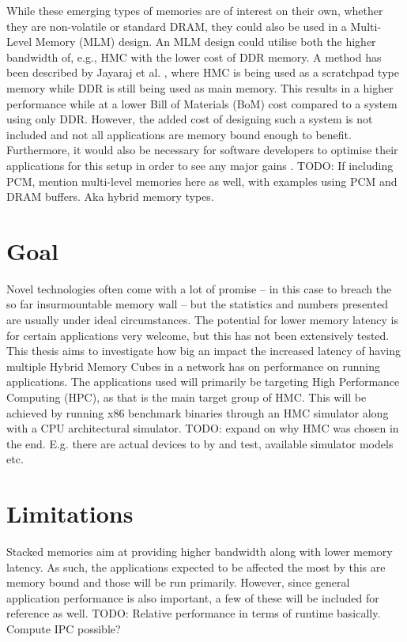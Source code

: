 While these emerging types of memories are of interest on their own, whether they are non-volatile or standard DRAM, they could also be used in a Multi-Level Memory (MLM) design. An MLM design could utilise both the higher bandwidth of, e.g., HMC with the lower cost of DDR memory. A method has been described by Jayaraj et al. \cite{Jayaraj:2015:PPM:2818950.2818976}, where HMC is being used as a scratchpad type memory while DDR is still being used as main memory. This results in a higher performance while at a lower Bill of Materials (BoM) cost compared to a system using only DDR. However, the added cost of designing such a system is not included and not all applications are memory bound enough to benefit. Furthermore, it would also be necessary for software developers to optimise their applications for this setup in order to see any major gains \cite{Bender:2015:KCT:2818950.2818977}\cite{BENDER2017213}. TODO: If including PCM, mention multi-level memories here as well, with examples using PCM and DRAM buffers. Aka hybrid memory types.
\bigskip


\section{Goal}
Novel technologies often come with a lot of promise -- in this case to breach the so far insurmountable memory wall -- but the statistics and numbers presented are usually under ideal circumstances. The potential for lower memory latency is for certain applications very welcome, but this has not been extensively tested. This thesis aims to investigate how big an impact the increased latency of having multiple Hybrid Memory Cubes in a network has on performance on running applications. The applications used will primarily be targeting High Performance Computing (HPC), as that is the main target group of HMC. This will be achieved by running x86 benchmark binaries through an HMC simulator along with a CPU architectural simulator. TODO: expand on why HMC was chosen in the end. E.g. there are actual devices to by and test, available simulator models etc. 

\section{Limitations}
Stacked memories aim at providing higher bandwidth along with lower memory latency. As such, the applications expected to be affected the most by this are memory bound and those will be run primarily. However, since general application performance is also important, a few of these will be included for reference as well. TODO: Relative performance in terms of runtime basically. Compute IPC possible? 
